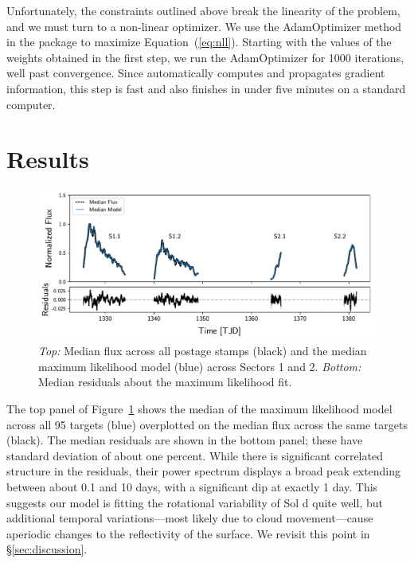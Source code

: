 \documentclass[modern]{aastex62}
\begin{document}
Unfortunately, the constraints outlined above break the linearity 
of the problem, and we must turn to a non-linear optimizer. We use the 
\textsf{AdamOptimizer} method in the \tf package \citep{Abadi2015}
to maximize Equation~(\ref{eq:nll}). Starting with the values of the
weights obtained in the first step, we run the \textsf{AdamOptimizer}
for 1000 iterations, well past convergence. Since \tf automatically
computes and propagates gradient information, this step is fast
and also finishes in under five minutes on a standard computer.

\section{Results}
\label{sec:results}

\begin{figure}[t!]
    \begin{centering}
    \includegraphics[width=\linewidth]{figures/model.pdf}
    \caption{\label{fig:model}
             \emph{Top:} Median flux across all postage stamps (black) and
             the median maximum likelihood model (blue) across Sectors 1 and 2.
             \emph{Bottom:} Median residuals about the maximum likelihood fit.
             }
    \end{centering}
\end{figure}

The top panel of Figure~\ref{fig:model} shows the median of the maximum likelihood model
across all 95 targets (blue) overplotted on the median flux across
the same targets (black). The median residuals are shown in the bottom panel; these have
standard deviation of about one percent. While there is significant correlated
structure in the residuals, their power spectrum displays a broad peak extending 
between about 0.1 and 10 days, with a significant dip at exactly 1 day. This
suggests our model is fitting the rotational variability of Sol d quite well, but
additional temporal variations---most likely due to cloud movement---cause aperiodic
changes to the reflectivity of the surface. We revisit this point in \S\ref{sec:discussion}.
\end{document}
